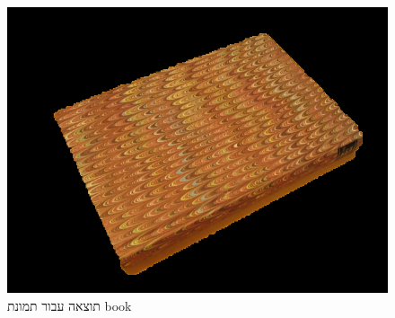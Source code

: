 \documentclass[a4paper,12pt]{article}
\begin{document}
\begin{figure}[H]
\begin{minipage}{0.3\textwidth}
        \includegraphics[width=\textwidth]{my_reasults/final_img/book_result.png}
        \caption{תוצאה עבור תמונת book}
    \end{minipage}
\end{figure}
\end{document}
